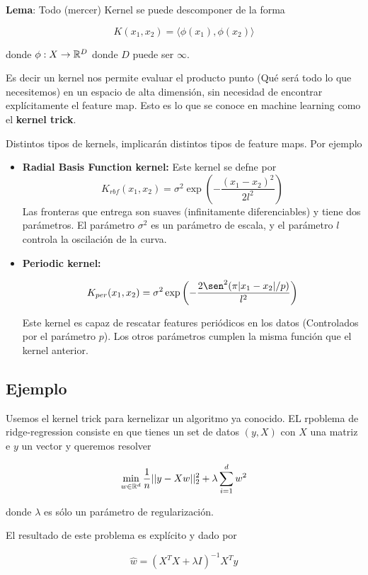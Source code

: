 \textbf{Lema}: Todo (mercer) Kernel se puede descomponer de la forma

$$K(x_1, x_2) = \langle \phi(x_1) , \phi(x_2) \rangle$$

donde $\phi: X \to {\mathbb R}^D$ donde $D$ puede ser $\infty$.

Es decir un kernel nos permite evaluar el producto punto (Qué será todo lo que necesitemos) en un espacio de alta dimensión, sin necesidad de encontrar explícitamente el feature map. Esto es lo que se conoce en machine learning como el \textbf{kernel trick}.

Distintos tipos de kernels, implicarán distintos tipos de feature maps. Por ejemplo 
\begin{itemize}
    \item \textbf{Radial Basis Function kernel:} Este kernel se defne por
    $$K_{rbf} (x_1 , x_2 ) = \sigma^2 \exp\left(-\frac{(x_1 -x_2)^2}{2l^2}\right)$$
    Las fronteras que entrega son suaves (infinitamente diferenciables) y tiene dos parámetros. El parámetro $\sigma^2$ es un parámetro de escala, y el parámetro $l$ controla la oscilación de la curva. 
    
    \item \textbf{Periodic kernel:}
    
    $$K_{per} (x_1 , x_2) = \sigma^2 \exp\left(- \frac{2\sen^2 (\pi|x_1 -x_2|/p)}{l^2}\right)$$
    
    Este kernel es capaz de rescatar features periódicos en los datos (Controlados por el parámetro $p$). Los otros parámetros cumplen la misma función que el kernel anterior. 
    
\end{itemize}

\subsection{Ejemplo}

Usemos el kernel trick para kernelizar un algoritmo ya conocido. EL rpoblema de ridge-regression consiste en que tienes un set de datos $(y,X)$ con $X$ una matriz e $y$ un vector y queremos resolver

$$\min_{w \in {\mathbb R}^d} \frac{1}{n}||y - Xw||^{2}_{2} + \lambda \sum\limits_{i=1}^{d} w^2$$

donde $\lambda$ es sólo un parámetro de regularización.

El resultado de este problema es explícito y dado por

$$\hat{w} = (X^T X + \lambda I)^{-1} X^T y$$

